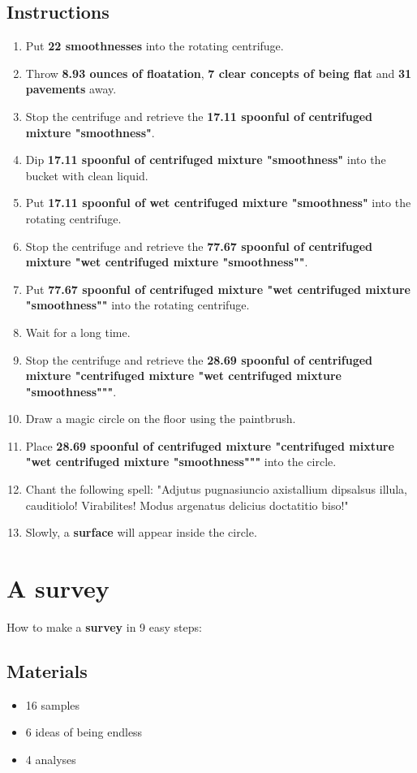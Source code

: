 \documentclass{article}
\begin{document}
\subsection{Instructions}\begin{enumerate}
\item 
Put \textbf{22 smoothnesses} into the rotating centrifuge.
\item 
Throw \textbf{8.93 ounces of floatation}, \textbf{7 clear concepts of being flat} and \textbf{31 pavements} away.
\item 
Stop the centrifuge and retrieve the \textbf{17.11 spoonful of centrifuged mixture "smoothness"}.
\item 
Dip \textbf{17.11 spoonful of centrifuged mixture "smoothness"} into the bucket with clean liquid.
\item 
Put \textbf{17.11 spoonful of wet centrifuged mixture "smoothness"} into the rotating centrifuge.
\item 
Stop the centrifuge and retrieve the \textbf{77.67 spoonful of centrifuged mixture "wet centrifuged mixture "smoothness""}.
\item 
Put \textbf{77.67 spoonful of centrifuged mixture "wet centrifuged mixture "smoothness""} into the rotating centrifuge.
\item 
Wait for a long time.
\item 
Stop the centrifuge and retrieve the \textbf{28.69 spoonful of centrifuged mixture "centrifuged mixture "wet centrifuged mixture "smoothness"""}.
\item 
Draw a magic circle on the floor using the paintbrush.
\item 
Place \textbf{28.69 spoonful of centrifuged mixture "centrifuged mixture "wet centrifuged mixture "smoothness"""} into the circle.
\item 
Chant the following spell: "Adjutus pugnasiuncio axistallium dipsalsus illula, cauditiolo! Virabilites! Modus argenatus delicius doctatitio biso!"
\item 
Slowly, a \textbf{surface} will appear inside the circle.
\end{enumerate}
\newpage
\section{A survey}How to make a \textbf{survey} in 9 easy steps:

\subsection{Materials}\begin{itemize}
\item 
16 samples
\item 
6 ideas of being endless
\item 
4 analyses
\end{itemize}
\end{document}
